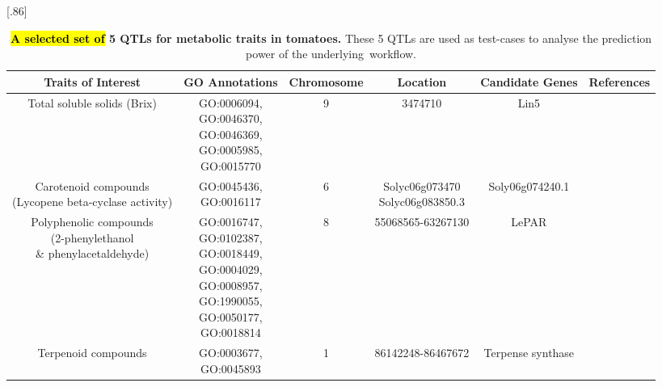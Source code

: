 \documentclass[applsci,article,accept,moreauthors,pdftex]{Definitions/mdpi}
\begin{document}
{\begin{table}[H]
\centering
\caption{\textbf{\hl{A selected set of} %
 5 QTLs for metabolic traits in tomatoes.} These 5 QTLs are used as test-cases  to analyse the prediction power of the underlying~workflow.}
\label{c5:tab1}
{
{
\scalebox{.86}[.86]{\begin{tabular}{c  c  c  c  c  c }
\toprule
\textbf{Traits of Interest} & \textbf{GO Annotations} & \textbf{Chromosome} & \textbf{Location} & \textbf{Candidate Genes} & \textbf{References} \\
\midrule
Total soluble solids (Brix) & \makecell{ GO:0006094, \\ GO:0046370, \\ GO:0046369, \\ GO:0005985, \\ GO:0015770 } &    9 &    3474710 &    Lin5 & \cite{fridman2002two} \\    %
\midrule
\makecell{Carotenoid compounds\\ (Lycopene beta-cyclase activity)} & \makecell{ GO:0045436, \\
GO:0016117} & 6 & \makecell{Solyc06g073470\\ Solyc06g083850.3} & Soly06g074240.1 & \cite{bouvier2000identification} \\ %
\midrule
\makecell{Polyphenolic compounds\\ (2-phenylethanol\\ \& phenylacetaldehyde)} &    \makecell{ GO:0016747, \\ GO:0102387, \\ GO:0018449, \\ GO:0004029, \\ GO:0008957, \\ GO:1990055, \\ GO:0050177, \\ GO:0018814} & 8 &    55068565-63267130 &    LePAR%
& \cite{tadmor2002identification}\\    %
\midrule
Terpenoid compounds & \makecell{ GO:0003677, \\ GO:0045893} & 1 & 86142248-86467672 & Terpense synthase & \cite{falara2011tomato} \\    %

\end{tabular}}}}
\end{table}}
\end{document}
